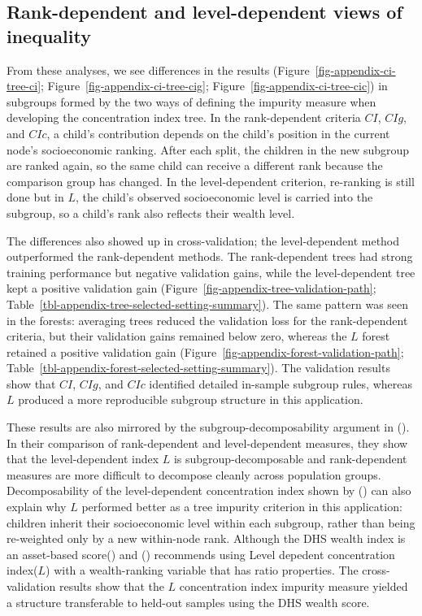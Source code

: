 \documentclass[
  11pt,
  a4paper,
]{article}
\begin{document}
\subsection{Rank-dependent and level-dependent views of
inequality}\label{rank-dependent-and-level-dependent-views-of-inequality}

From these analyses, we see differences in the results
(Figure~\ref{fig-appendix-ci-tree-ci};
Figure~\ref{fig-appendix-ci-tree-cig};
Figure~\ref{fig-appendix-ci-tree-cic}) in subgroups formed by the two
ways of defining the impurity measure when developing the concentration
index tree. In the rank-dependent criteria \(CI\), \(CIg\), and \(CIc\),
a child's contribution depends on the child's position in the current
node's socioeconomic ranking. After each split, the children in the new
subgroup are ranked again, so the same child can receive a different
rank because the comparison group has changed. In the level-dependent
criterion, re-ranking is still done but in \(L\), the child's observed
socioeconomic level is carried into the subgroup, so a child's rank also
reflects their wealth level.

The differences also showed up in cross-validation; the level-dependent
method outperformed the rank-dependent methods. The rank-dependent trees
had strong training performance but negative validation gains, while the
level-dependent tree kept a positive validation gain
(Figure~\ref{fig-appendix-tree-validation-path};
Table~\ref{tbl-appendix-tree-selected-setting-summary}). The same
pattern was seen in the forests: averaging trees reduced the validation
loss for the rank-dependent criteria, but their validation gains
remained below zero, whereas the \(L\) forest retained a positive
validation gain (Figure~\ref{fig-appendix-forest-validation-path};
Table~\ref{tbl-appendix-forest-selected-setting-summary}). The
validation results show that \(CI\), \(CIg\), and \(CIc\) identified
detailed in-sample subgroup rules, whereas \(L\) produced a more
reproducible subgroup structure in this application.

These results are also mirrored by the subgroup-decomposability argument
in (). In their comparison of rank-dependent and level-dependent
measures, they show that the level-dependent index \(L\) is
subgroup-decomposable and rank-dependent measures are more difficult to
decompose cleanly across population groups. Decomposability of the
level-dependent concentration index shown by
()
can also explain why \(L\) performed better as a tree impurity criterion
in this application: children inherit their socioeconomic level within
each subgroup, rather than being re-weighted only by a new within-node
rank. Although the DHS wealth index is an asset-based
score() and () recommends using Level depedent concentration
index(\(L\)) with a wealth-ranking variable that has ratio properties.
The cross-validation results show that the \(L\) concentration index
impurity measure yielded a structure transferable to held-out samples
using the DHS wealth score.
\end{document}
